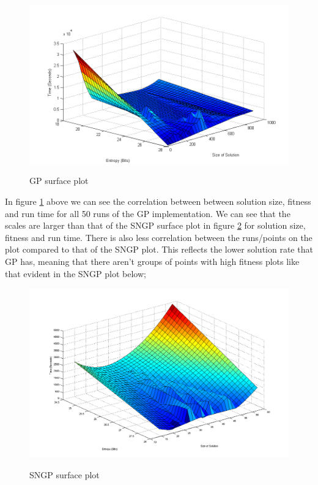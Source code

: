 \documentclass[a4paper,10.5pt]{article}
\begin{document}
\begin{figure}[H]
\centering
\caption{GP surface plot}
\includegraphics[scale = 0.6]{gp.png}
\label{gpsurf}
\end{figure}

In figure \ref{gpsurf} above we can see the correlation between  between solution size, fitness and run time for all 50 runs of the GP implementation. We can see that the scales are larger than that of the SNGP surface plot in figure \ref{sngpsurf} for solution size, fitness and run time. There is also less correlation between the runs/points on the plot compared to that of the SNGP plot. This reflects the lower solution rate that GP has, meaning that there aren't groups of points with high fitness plots like that evident in the SNGP plot below;

\begin{figure}[H]
\centering
\caption{SNGP surface plot}
\includegraphics[scale=0.5]{sngp2.png}
\label{sngpsurf}
\end{figure}
\end{document}
